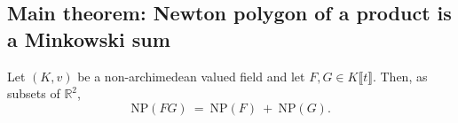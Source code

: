 \subsection{Main theorem: Newton polygon of a product is a Minkowski sum}

\begin{theorem}
  \label{thm:newton_polygon_mul}
  
  \leanok
  Let $(K,v)$ be a non-archimedean valued field and let $F,G\in K\llbracket t\rrbracket$.
  Then, as subsets of $\mathbb{R}^2$,
  \[
    \mathrm{NP}(FG)\ =\ \mathrm{NP}(F)\ +\ \mathrm{NP}(G).
  \]
\end{theorem}

